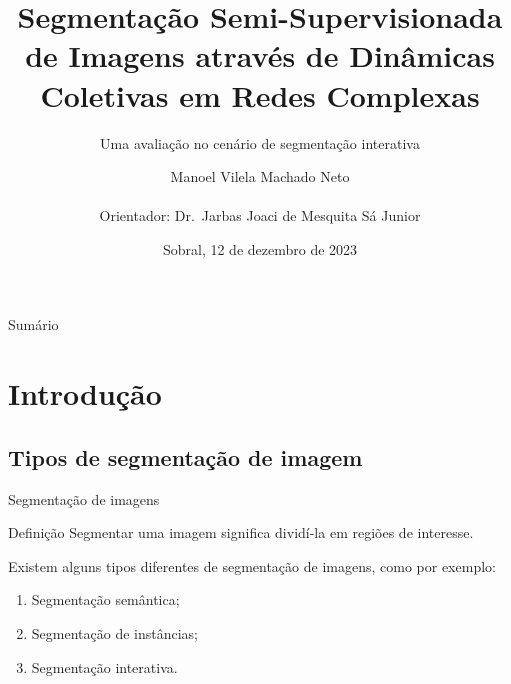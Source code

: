 \documentclass{templatebeamerufc/libs/ufc_format}
\title[EGSIS]{\textbf{Segmentação Semi-Supervisionada de Imagens através de
Dinâmicas Coletivas em Redes Complexas}}
\subtitle{Uma avaliação no cenário de segmentação interativa}
\author[Manoel Vilela Machado Neto]{
  Manoel Vilela Machado Neto
  \\~\\
  Orientador: Dr.\ Jarbas Joaci de Mesquita Sá Junior
}
\institute[UFC]{
    \normalsize{\email{manoel.machado@alu.ufc.br}}
    \newline
    \department{Engenharia da Computação}
    \newline
    \ufc{}
}
\date{Sobral, 12 de dezembro de 2023}
\begin{document}

\begin{frame}{}
    \maketitle
\end{frame}

\begin{frame}[allowframebreaks]{Sumário}
  \tableofcontents[sections={1---2}]  %
    \framebreak{}
  \tableofcontents[sections={3---5}]  %
\end{frame}

\section{Introdução}

\subsection{Tipos de segmentação de imagem}

\begin{frame}{Segmentação de imagens}
  \begin{block}{Definição}
    Segmentar uma imagem significa dividí-la em regiões de interesse.
  \end{block}

  Existem alguns tipos diferentes de segmentação de imagens, como por
exemplo:
  \begin{enumerate}
    \item Segmentação semântica;
    \item Segmentação de instâncias;
    \item Segmentação interativa.
  \end{enumerate}
\end{frame}
\end{document}
